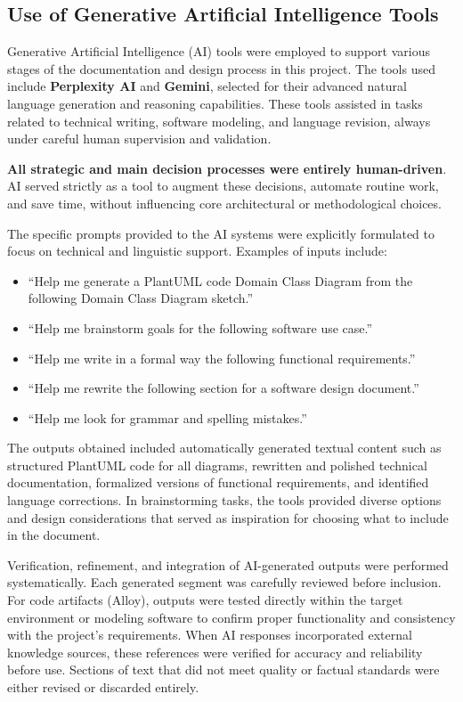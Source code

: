 \subsection{Use of Generative Artificial Intelligence Tools}

Generative Artificial Intelligence (AI) tools were employed to support various stages of the documentation and design process in this project. The tools used include \textbf{Perplexity AI} and \textbf{Gemini}, selected for their advanced natural language generation and reasoning capabilities. These tools assisted in tasks related to technical writing, software modeling, and language revision, always under careful human supervision and validation.

\textbf{All strategic and main decision processes were entirely human-driven}. AI served strictly as a tool to augment these decisions, automate routine work, and save time, without influencing core architectural or methodological choices.

The specific prompts provided to the AI systems were explicitly formulated to focus on technical and linguistic support. Examples of inputs include: 
\begin{itemize}
    \item ``Help me generate a PlantUML code Domain Class Diagram from the following Domain Class Diagram sketch.''
    \item ``Help me brainstorm goals for the following software use case.''
    \item ``Help me write in a formal way the following functional requirements.''
    \item ``Help me rewrite the following section for a software design document.''
    \item ``Help me look for grammar and spelling mistakes.''
\end{itemize}

The outputs obtained included automatically generated textual content such as structured PlantUML code for all diagrams, rewritten and polished technical documentation, formalized versions of functional requirements, and identified language corrections. In brainstorming tasks, the tools provided diverse options and design considerations that served as inspiration for choosing what to include in the document.

Verification, refinement, and integration of AI-generated outputs were performed systematically. Each generated segment was carefully reviewed before inclusion. For code artifacts (Alloy), outputs were tested directly within the target environment or modeling software to confirm proper functionality and consistency with the project's requirements. When AI responses incorporated external knowledge sources, these references were verified for accuracy and reliability before use. Sections of text that did not meet quality or factual standards were either revised or discarded entirely.

